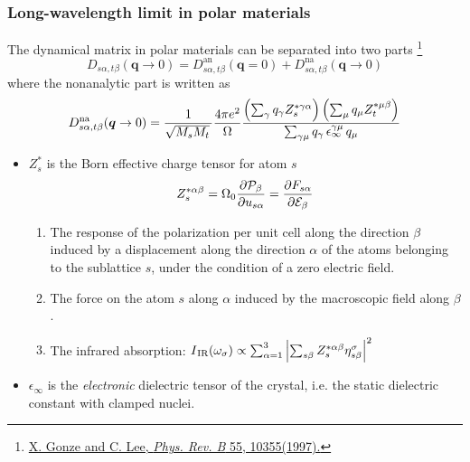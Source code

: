\begin{frame}
  \frametitle{Long-wavelength limit in polar materials}
  The dynamical matrix in polar materials can be separated into two parts
  \footnote{
    \href{https://journals.aps.org/prb/abstract/10.1103/PhysRevB.55.10355}
         {X. Gonze and C. Lee, \textit{Phys. Rev. B}\/ 55, 10355(1997).}
  }
  \begin{equation*}
    D_{s\alpha,t\beta}(\boldsymbol{q} \to 0) = 
    D^{\text{an}}_{s\alpha,t\beta}(\boldsymbol{q} = 0) +
    D^{\text{na}}_{s\alpha,t\beta}(\boldsymbol{q} \to 0)
  \end{equation*}
  where the nonanalytic part is written as
  \begin{equation}
    \label{eq:dynmat_nac}
    D^{\text{na}}_{s\alpha,t\beta}(\boldsymbol{q} \to 0)
    =
    {1\over\sqrt{M_sM_t}\,}
    {4\pi e^2\over\Omega}
    \frac{
      \left(
        \sum_{\gamma} q_\gamma Z^{*\gamma\alpha}_s
      \right) 
      \left(
      \sum_{\mu} q_\mu Z^{*\mu\beta}_t
      \right) 
    }{
      \sum_{\gamma\mu} q_\gamma \, \epsilon_\infty^{\gamma\mu} \,q_\mu 
    }
  \end{equation}
  \begin{itemize}
    \item
      $Z^*_s$ is the Born effective charge tensor for atom $s$
        \begin{equation*}
        Z_s^{*\alpha\beta} = \Omega_0
        \frac{
            \partial {\cal P}_\beta
        }{
            \partial u_{s\alpha}
        }
        =
        \frac{
            \partial F_{s\alpha}
        }{
            \partial {\cal E}_\beta
        }
        \end{equation*}

        \begin{enumerate}
        \setlength\itemsep{\smallskipamount}
        \item The response of the polarization per unit cell along the direction
          $\beta$ induced by a displacement along the direction $\alpha$ of the atoms
          belonging to the sublattice $s$, under the condition of a zero electric
          field.
          
        \item The force on the atom $s$ along $\alpha$ induced by the macroscopic
          field along $\beta$.
          
        \item The infrared absorption: $
            I\/_{\text{IR}}(\omega_\sigma)
            \propto
            \sum_{\alpha=1}^3
            \left|
              \sum_{s\beta}
              Z^{*\alpha\beta}_s \eta_{s\beta}^\sigma
            \right|^2
          $ 
        \end{enumerate}
        
    \item $\epsilon_\infty$ is the \emph{electronic} dielectric tensor of the
      crystal, i.e. the static dielectric constant with clamped nuclei.
  \end{itemize}
\end{frame}

